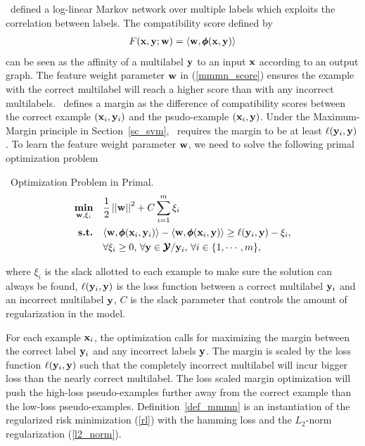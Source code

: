 {\mmmn\ defined a log-linear Markov network over multiple labels which exploits the correlation between labels.
The compatibility score defined by 
\begin{align}
	F(\mathbf {x},\mathbf {y};\mathbf {w}) = \langle \mathbf {w}, \pmb \phi(\mathbf {x},\mathbf {y}) \rangle \label{mmmn_score}
\end{align}
can be seen as the affinity of a multilabel $\mathbf {y}$ to an input $\mathbf {x}$ according to an output graph.
The feature weight parameter $\mathbf {w}$ in (\ref{mmmn_score}) ensures the example with the correct multilabel will reach a higher score than with any incorrect multilabels.
\mmmn\ defines a margin as the difference of compatibility scores between the correct example $(\mathbf {x}_i,\mathbf {y}_i)$ and the psudo-example $(\mathbf {x}_i,\mathbf {y})$.
Under the Maximum-Margin principle in Section~\ref{sc_svm}, \mmmn\ requires the margin to be at least $\mathbf {\ell}(\mathbf {y}_i,{\mathbf {y}})$.
To learn the feature weight parameter $\mathbf {w}$, we need to solve the following primal optimization problem
\begin{definition}{\mmmn\ Optimization Problem in Primal.}\label{def_mmmn}
	\begin{align*}
		\underset{\mathbf {w},\mathbf{\xi}_i}{\textbf{min}} & \quad\frac{1}{2}\left|\left| \mathbf {w} \right|\right|^2 + C\sum_{i=1}^{m}\xi_i \\
		\textbf{s.t.} & \quad\langle \mathbf {w}, \pmb \phi(\mathbf {x}_i,\mathbf {y}_i) \rangle - \langle \mathbf {w}, \pmb \phi(\mathbf {x}_i,\mathbf {y}) \rangle \ge \mathbf {\ell}(\mathbf {y}_i,\mathbf {y})-\xi_i,\\
		& \quad \forall \xi_i\ge0,\, \forall \mathbf {y}\in\pmb {\mathcal{Y}}/\mathbf {y}_i,\, \forall i\in\{1,\cdots,m\},
	\end{align*}
\end{definition}
\noindent
where $\xi_i$ is the slack allotted to each example to make sure the solution can always be found, $\mathbf {\ell}(\mathbf {y}_i,\mathbf {y})$ is the loss function between a correct multilabel $\mathbf {y}_i$ and an incorrect multilabel $\mathbf {y}$, $C$ is the slack parameter that controls the amount of regularization in the model.

For each example $\mathbf {x}_i$, the optimization calls for maximizing the margin between the correct label $\mathbf {y}_i$ and any incorrect labels $\mathbf {y}$.
The margin is scaled by the loss function $\mathbf {\ell}(\mathbf {y}_i,{\mathbf {y}})$ such that the completely incorrect multilabel will incur bigger loss than the nearly correct multilabel.
The loss scaled margin optimization will push the high-loss pseudo-examples further away from the correct example than the low-loss pseudo-examples.
Definition~\ref{def_mmmn} is an instantiation of the regularized risk minimization (\ref{rl}) with the hamming loss and the $L_2$-norm regularization (\ref{l2_norm}).

}

